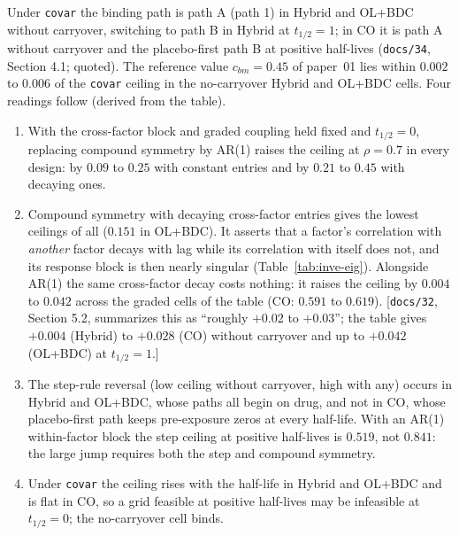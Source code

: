 \documentclass[11pt]{article}
\newcommand{\note}[1]{\textcolor{blue!60!black}{\small [#1]}}
\newcommand{\code}[1]{\texttt{#1}}
\begin{document}
Under \code{covar} the binding path is path A (path 1) in Hybrid and
OL+BDC without carryover, switching to path B in Hybrid at
$t_{1/2} = 1$; in CO it is path A without carryover and the
placebo-first path B at positive half-lives (\code{docs/34}, Section
4.1; quoted). The reference value $c_{bm} = 0.45$ of paper~01 lies
within $0.002$ to $0.006$ of the \code{covar} ceiling in the
no-carryover Hybrid and OL+BDC cells. Four readings follow (derived from
the table).
\begin{enumerate}[label=(\roman*), itemsep=2pt]
\item With the cross-factor block and graded coupling held fixed and
  $t_{1/2} = 0$, replacing compound symmetry by AR(1) raises the ceiling
  at $\rho = 0.7$ in every design: by $0.09$ to $0.25$ with constant
  entries and by $0.21$ to $0.45$ with decaying ones.
\item Compound symmetry with decaying cross-factor entries gives the
  lowest ceilings of all ($0.151$ in OL+BDC). It asserts that a
  factor's correlation with \emph{another} factor decays with lag while
  its correlation with itself does not, and its response block is then
  nearly singular (Table~\ref{tab:inve-eig}). Alongside AR(1) the same
  cross-factor decay costs nothing: it raises the ceiling by $0.004$ to
  $0.042$ across the graded cells of the table (CO: $0.591$ to
  $0.619$). \note{\code{docs/32}, Section 5.2, summarizes this as
  ``roughly $+0.02$ to $+0.03$''; the table gives $+0.004$ (Hybrid) to
  $+0.028$ (CO) without carryover and up to $+0.042$ (OL+BDC) at
  $t_{1/2} = 1$.}
\item The step-rule reversal (low ceiling without carryover, high with
  any) occurs in Hybrid and OL+BDC, whose paths all begin on drug, and
  not in CO, whose placebo-first path keeps pre-exposure zeros at every
  half-life. With an AR(1) within-factor block the step ceiling at
  positive half-lives is $0.519$, not $0.841$: the large jump requires
  both the step and compound symmetry.
\item Under \code{covar} the ceiling rises with the half-life in Hybrid
  and OL+BDC and is flat in CO, so a grid feasible at positive
  half-lives may be infeasible at $t_{1/2} = 0$; the no-carryover cell
  binds.
\end{enumerate}
\end{document}
